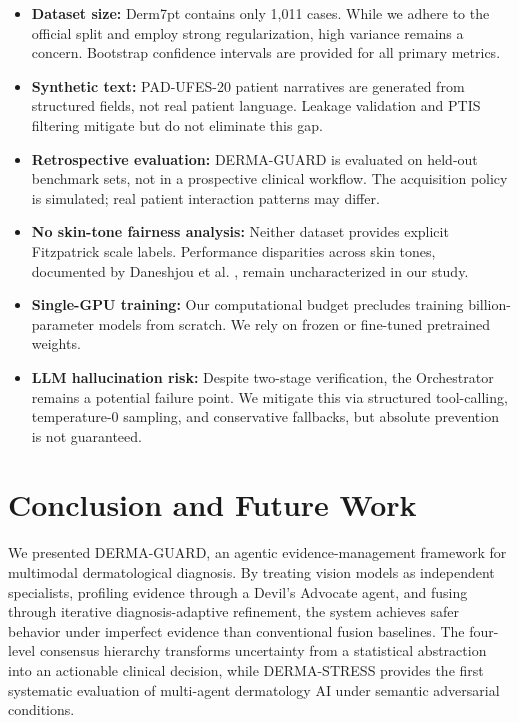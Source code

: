 \documentclass[conference]{IEEEtran}
\begin{document}
\begin{itemize}
    \item \textbf{Dataset size:} Derm7pt contains only 1,011 cases. While we adhere to the official split and employ strong regularization, high variance remains a concern. Bootstrap confidence intervals are provided for all primary metrics.
    \item \textbf{Synthetic text:} PAD-UFES-20 patient narratives are generated from structured fields, not real patient language. Leakage validation and PTIS filtering mitigate but do not eliminate this gap.
    \item \textbf{Retrospective evaluation:} DERMA-GUARD is evaluated on held-out benchmark sets, not in a prospective clinical workflow. The acquisition policy is simulated; real patient interaction patterns may differ.
    \item \textbf{No skin-tone fairness analysis:} Neither dataset provides explicit Fitzpatrick scale labels. Performance disparities across skin tones, documented by Daneshjou et al. \cite{daneshjou2022}, remain uncharacterized in our study.
    \item \textbf{Single-GPU training:} Our computational budget precludes training billion-parameter models from scratch. We rely on frozen or fine-tuned pretrained weights.
    \item \textbf{LLM hallucination risk:} Despite two-stage verification, the Orchestrator remains a potential failure point. We mitigate this via structured tool-calling, temperature-0 sampling, and conservative fallbacks, but absolute prevention is not guaranteed.
\end{itemize}

\section{Conclusion and Future Work}
\label{sec:conclusion}

We presented DERMA-GUARD, an agentic evidence-management framework for multimodal dermatological diagnosis. By treating vision models as independent specialists, profiling evidence through a Devil's Advocate agent, and fusing through iterative diagnosis-adaptive refinement, the system achieves safer behavior under imperfect evidence than conventional fusion baselines. The four-level consensus hierarchy transforms uncertainty from a statistical abstraction into an actionable clinical decision, while DERMA-STRESS provides the first systematic evaluation of multi-agent dermatology AI under semantic adversarial conditions.
\end{document}
